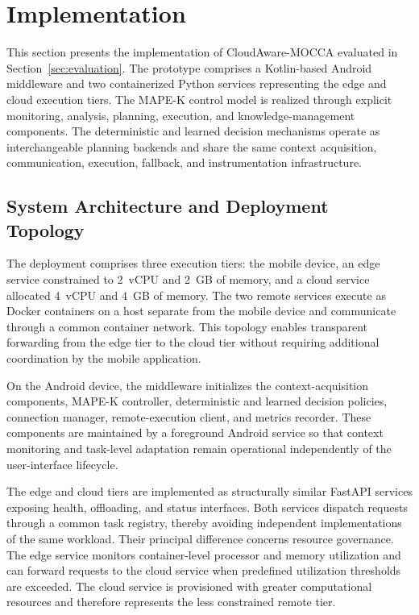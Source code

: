 \section{Implementation}
\label{sec:implementation}

This section presents the implementation of CloudAware-MOCCA evaluated in
Section~\ref{sec:evaluation}. The prototype comprises a Kotlin-based Android
middleware and two containerized Python services representing the edge and
cloud execution tiers. The MAPE-K control model is realized through explicit
monitoring, analysis, planning, execution, and knowledge-management components.
The deterministic and learned decision mechanisms operate as interchangeable
planning backends and share the same context acquisition, communication,
execution, fallback, and instrumentation infrastructure.


\subsection{System Architecture and Deployment Topology}
\label{subsec:implementation_architecture}

The deployment comprises three execution tiers: the mobile device, an edge
service constrained to 2~vCPU and 2~GB of memory, and a cloud service allocated
4~vCPU and 4~GB of memory. The two remote services execute as Docker containers
on a host separate from the mobile device and communicate through a common
container network. This topology enables transparent forwarding from the edge
tier to the cloud tier without requiring additional coordination by the mobile
application.

On the Android device, the middleware initializes the context-acquisition
components, MAPE-K controller, deterministic and learned decision policies,
connection manager, remote-execution client, and metrics recorder. These
components are maintained by a foreground Android service so that context
monitoring and task-level adaptation remain operational independently of the
user-interface lifecycle.

The edge and cloud tiers are implemented as structurally similar FastAPI
services exposing health, offloading, and status interfaces. Both services
dispatch requests through a common task registry, thereby avoiding independent
implementations of the same workload. Their principal difference concerns
resource governance. The edge service monitors container-level processor and
memory utilization and can forward requests to the cloud service when
predefined utilization thresholds are exceeded. The cloud service is
provisioned with greater computational resources and therefore represents the
less constrained remote tier.

